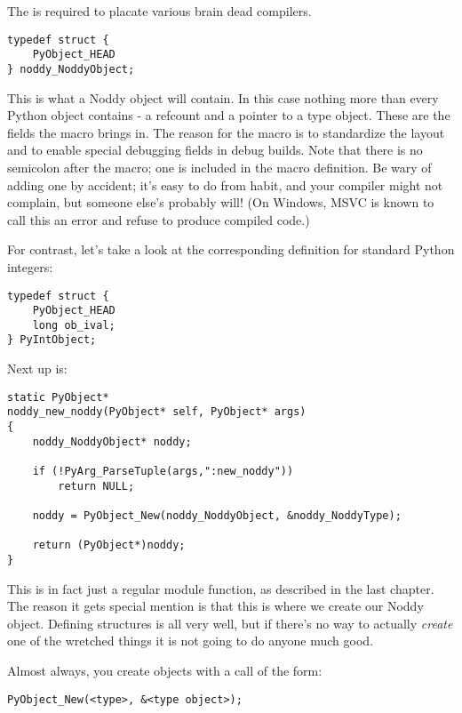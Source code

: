 The  is required to placate various brain dead
compilers.

\begin{verbatim}
typedef struct {
    PyObject_HEAD
} noddy_NoddyObject;
\end{verbatim}

This is what a Noddy object will contain.  In this case nothing more
than every Python object contains - a refcount and a pointer to a type
object.  These are the fields the  macro brings
in.  The reason for the macro is to standardize the layout and to
enable special debugging fields in debug builds.  Note that there is
no semicolon after the  macro; one is included in
the macro definition.  Be wary of adding one by accident; it's easy to
do from habit, and your compiler might not complain, but someone
else's probably will!  (On Windows, MSVC is known to call this an
error and refuse to produce compiled code.)

For contrast, let's take a look at the corresponding definition for
standard Python integers:

\begin{verbatim}
typedef struct {
    PyObject_HEAD
    long ob_ival;
} PyIntObject;
\end{verbatim}

Next up is:

\begin{verbatim}
static PyObject*
noddy_new_noddy(PyObject* self, PyObject* args)
{
    noddy_NoddyObject* noddy;

    if (!PyArg_ParseTuple(args,":new_noddy")) 
        return NULL;

    noddy = PyObject_New(noddy_NoddyObject, &noddy_NoddyType);

    return (PyObject*)noddy;
}
\end{verbatim}

This is in fact just a regular module function, as described in the
last chapter.  The reason it gets special mention is that this is
where we create our Noddy object.  Defining 
structures is all very well, but if there's no way to actually
\emph{create} one of the wretched things it is not going to do anyone
much good.

Almost always, you create objects with a call of the form:

\begin{verbatim}
PyObject_New(<type>, &<type object>);
\end{verbatim}

